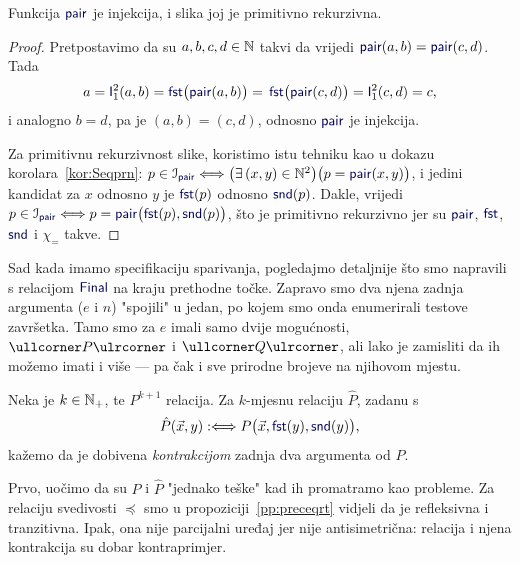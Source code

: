 \begin{propozicija}[{name=[injektivnost i primitivna rekurzivnost slike sparivanja]}]
Funkcija $\f{pair}$ je injekcija, i slika joj je primitivno rekurzivna.
\end{propozicija}
\begin{proof}
Pretpostavimo da su $a,b,c,d\in{\mathbb N}$ takvi da vrijedi $\f{pair}(a,b)=\f{pair}(c,d)$. Tada
\begin{equation}
    a=\f I_1^2(a,b)=\f{fst}\bigl(\f{pair}(a,b)\bigr)=\,
    \f{fst}\bigl(\f{pair}(c,d)\bigr)=\f I_1^2(c,d)=c\text,
\end{equation}
i analogno $b=d$, pa je $(a,b)=(c,d)$, odnosno $\f{pair}$ je injekcija.

Za primitivnu rekurzivnost slike, koristimo istu tehniku kao u dokazu korolara~\ref{kor:Seqprn}: $p\in\im{\f{pair}}\Longleftrightarrow\bigl(\exists\,(x,y)\in\N^2\bigr)\bigl(p=\f{pair}(x,y)\bigr)$, i jedini kandidat za $x$ odnosno $y$ je $\f{fst}(p)$ odnosno $\f{snd}(p)$. Dakle, vrijedi
    $p\in\im{\f{pair}}\Longleftrightarrow p=\f{pair}\bigl(\f{fst}(p),\f{snd}(p)\bigr)$,
što je primitivno rekurzivno jer su $\f{pair}$, $\f{fst}$, $\f{snd}$ i $\chi_=$ takve.
\end{proof}

Sad kada imamo specifikaciju sparivanja, pogledajmo detaljnije što smo napravili s relacijom $\f{Final}$ na kraju prethodne točke. Zapravo smo dva njena zadnja argumenta ($e$ i $n$) "spojili" u jedan, po kojem smo onda enumerirali testove završetka. Tamo smo za $e$ imali samo dvije mogućnosti, $\kprog P$ i $\kprog Q$, ali lako je zamisliti da ih možemo imati i više --- pa čak i sve prirodne brojeve na njihovom mjestu.

\begin{definicija}[{name=[kontrakcija brojevne relacije]}]
Neka je $k\in{\mathbb N}_+$, te $P^{k+1}$ relacija. Za $k$-mjesnu relaciju $\hat P$, zadanu s
\begin{equation}
    \hat P(\vec x,y):\Longleftrightarrow P\bigl(\vec x,\f{fst}(y),\f{snd}(y)\bigr)\text,
\end{equation}
kažemo da je dobivena \emph{kontrakcijom} zadnja dva argumenta od $P$.
\end{definicija}

Prvo, uočimo da su $P$ i $\hat P$ "jednako teške" kad ih promatramo kao probleme. Za relaciju svedivosti $\preceq$ smo u propoziciji~\ref{pp:preceqrt} vidjeli da je refleksivna i tranzitivna. Ipak, ona nije parcijalni uređaj jer nije antisimetrična: relacija i njena kontrakcija su dobar kontraprimjer.

